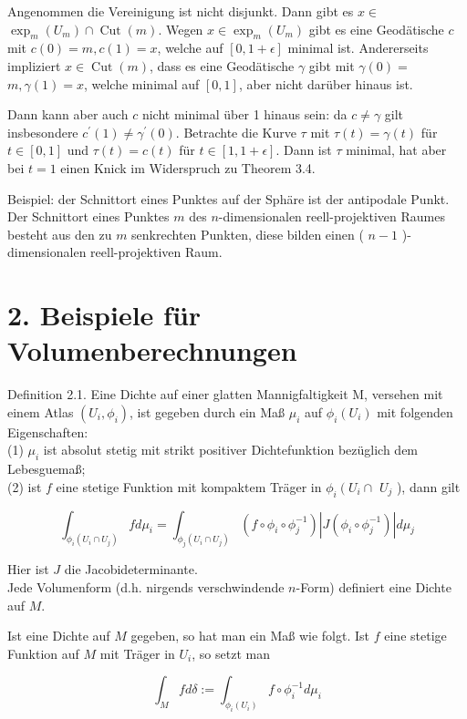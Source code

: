 \documentclass[10pt, letterpaper]{article}
\begin{document}
Angenommen die Vereinigung ist nicht disjunkt. Dann gibt es $x \in$ $\exp _{m}\left(U_{m}\right) \cap \operatorname{Cut}(m)$. Wegen $x \in \exp _{m}\left(U_{m}\right)$ gibt es eine Geodätische $c$ mit $c(0)=m, c(1)=x$, welche auf $[0,1+\epsilon]$ minimal ist. Andererseits impliziert $x \in \operatorname{Cut}(m)$, dass es eine Geodätische $\gamma$ gibt mit $\gamma(0)=$ $m, \gamma(1)=x$, welche minimal auf $[0,1]$, aber nicht darüber hinaus ist.

Dann kann aber auch $c$ nicht minimal über 1 hinaus sein: da $c \neq \gamma$ gilt insbesondere $c^{\prime}(1) \neq \gamma^{\prime}(0)$. Betrachte die Kurve $\tau$ mit $\tau(t)=\gamma(t)$ für $t \in[0,1]$ und $\tau(t)=c(t)$ für $t \in[1,1+\epsilon]$. Dann ist $\tau$ minimal, hat aber bei $t=1$ einen Knick im Widerspruch zu Theorem 3.4.

Beispiel: der Schnittort eines Punktes auf der Sphäre ist der antipodale Punkt. Der Schnittort eines Punktes $m$ des $n$-dimensionalen reell-projektiven Raumes besteht aus den zu $m$ senkrechten Punkten, diese bilden einen ( $n-1$ )-dimensionalen reell-projektiven Raum.

\section*{2. Beispiele für Volumenberechnungen}
Definition 2.1. Eine Dichte auf einer glatten Mannigfaltigkeit M, versehen mit einem Atlas $\left(U_{i}, \phi_{i}\right)$, ist gegeben durch ein Maß $\mu_{i}$ auf $\phi_{i}\left(U_{i}\right)$ mit folgenden Eigenschaften:\\
(1) $\mu_{i}$ ist absolut stetig mit strikt positiver Dichtefunktion bezüglich dem Lebesguemaß;\\
(2) ist $f$ eine stetige Funktion mit kompaktem Träger in $\phi_{i}\left(U_{i} \cap\right.$ $U_{j}$ ), dann gilt

$$
\int_{\phi_{i}\left(U_{i} \cap U_{j}\right)} f d \mu_{i}=\int_{\phi_{j}\left(U_{i} \cap U_{j}\right)}\left(f \circ \phi_{i} \circ \phi_{j}^{-1}\right)\left|J\left(\phi_{i} \circ \phi_{j}^{-1}\right)\right| d \mu_{j}
$$

Hier ist $J$ die Jacobideterminante.\\
Jede Volumenform (d.h. nirgends verschwindende $n$-Form) definiert eine Dichte auf $M$.

Ist eine Dichte auf $M$ gegeben, so hat man ein Maß wie folgt. Ist $f$ eine stetige Funktion auf $M$ mit Träger in $U_{i}$, so setzt man

$$
\int_{M} f d \delta:=\int_{\phi_{i}\left(U_{i}\right)} f \circ \phi_{i}^{-1} d \mu_{i}
$$
\end{document}

